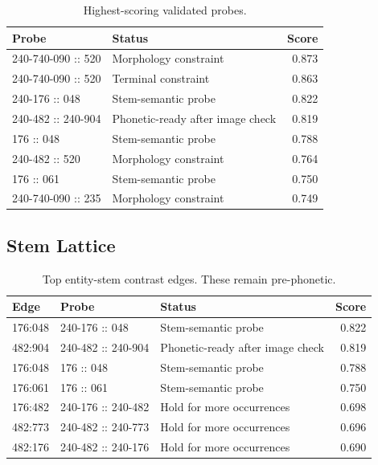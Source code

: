 \begin{table}[htbp]
\centering
\footnotesize
\begin{tabular}{p{}p{}r}
\toprule
\textbf{Probe} & \textbf{Status} & \textbf{Score} \\
\midrule
240-740-090 :: 520 & Morphology constraint & 0.873 \\
240-740-090 :: 520 & Terminal constraint & 0.863 \\
240-176 :: 048 & Stem-semantic probe & 0.822 \\
240-482 :: 240-904 & Phonetic-ready after image check & 0.819 \\
176 :: 048 & Stem-semantic probe & 0.788 \\
240-482 :: 520 & Morphology constraint & 0.764 \\
176 :: 061 & Stem-semantic probe & 0.750 \\
240-740-090 :: 235 & Morphology constraint & 0.749 \\
\bottomrule
\end{tabular}
\caption{Highest-scoring validated probes.}
\end{table}

\subsection{Stem Lattice}

\begin{table}[htbp]
\centering
\footnotesize
\begin{tabular}{lp{}p{}r}
\toprule
\textbf{Edge} & \textbf{Probe} & \textbf{Status} & \textbf{Score} \\
\midrule
176:048 & 240-176 :: 048 & Stem-semantic probe & 0.822 \\
482:904 & 240-482 :: 240-904 & Phonetic-ready after image check & 0.819 \\
176:048 & 176 :: 048 & Stem-semantic probe & 0.788 \\
176:061 & 176 :: 061 & Stem-semantic probe & 0.750 \\
176:482 & 240-176 :: 240-482 & Hold for more occurrences & 0.698 \\
482:773 & 240-482 :: 240-773 & Hold for more occurrences & 0.696 \\
482:176 & 240-482 :: 240-176 & Hold for more occurrences & 0.690 \\
\bottomrule
\end{tabular}
\caption{Top entity-stem contrast edges. These remain pre-phonetic.}
\end{table}

